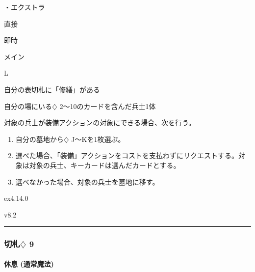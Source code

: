 \documentclass[letterpaper,10pt,dvipdfmx]{sphinxmanual}
\begin{document}
\sphinxAtStartPar
・エクストラ

\sphinxAtStartPar
{} 直接

\sphinxAtStartPar
{} 即時

\sphinxAtStartPar
{} メイン

\sphinxAtStartPar
{} L

\sphinxAtStartPar
{}

\sphinxAtStartPar
自分の表切札に「修繕」がある

\sphinxAtStartPar
{}

\sphinxAtStartPar
自分の場にいる{\normalsize $\diamondsuit$} 2〜10のカードを含んだ兵士1体

\sphinxAtStartPar
{}

\sphinxAtStartPar
対象の兵士が装備アクションの対象にできる場合、次を行う。
\begin{enumerate}
%
\item {} 
\sphinxAtStartPar
自分の墓地から{\normalsize $\diamondsuit$} J〜Kを1枚選ぶ。

\item {} 
\sphinxAtStartPar
選べた場合、「装備」アクションをコストを支払わずにリクエストする。対象は対象の兵士、キーカードは選んだカードとする。

\item {} 
\sphinxAtStartPar
選べなかった場合、対象の兵士を墓地に移す。

\end{enumerate}

\sphinxAtStartPar
{}  ex4.14.0

\sphinxAtStartPar
{}  v8.2


\bigskip\hrule\bigskip



\subsubsection{切札{\normalsize $\diamondsuit$} 9}
\label{\detokenize{auto/frameActionlist:id61}}

\paragraph{休息 (通常魔法)}
\label{\detokenize{auto/frameActionlist:act-rest}}\label{\detokenize{auto/frameActionlist:id62}}
\sphinxAtStartPar
{}
\end{document}
